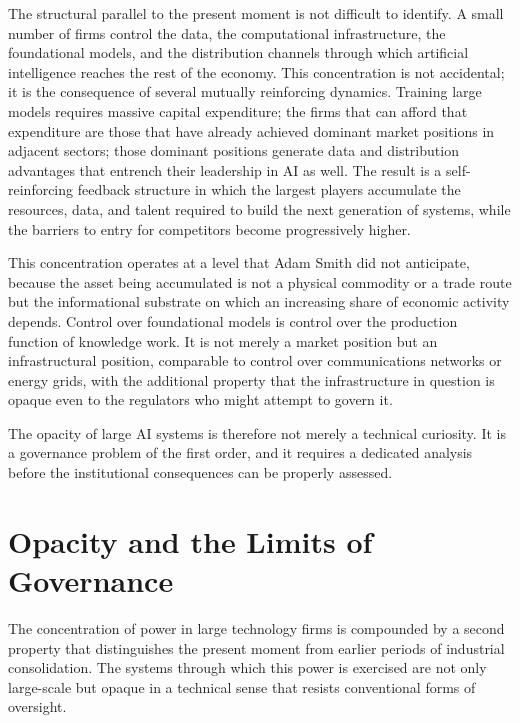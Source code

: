 \documentclass[11pt, a4paper]{article}
\theoremstyle{plain}
\theoremstyle{definition}
\begin{document}
The structural parallel to the present moment is not difficult to identify.
A small number of firms control the data, the computational infrastructure,
the foundational models, and the distribution channels through which artificial
intelligence reaches the rest of the economy. This concentration is not
accidental; it is the consequence of several mutually reinforcing dynamics.
Training large models requires massive capital expenditure; the firms that
can afford that expenditure are those that have already achieved dominant
market positions in adjacent sectors; those dominant positions generate data
and distribution advantages that entrench their leadership in AI as well.
The result is a self-reinforcing feedback structure in which the largest
players accumulate the resources, data, and talent required to build the
next generation of systems, while the barriers to entry for competitors
become progressively higher.

This concentration operates at a level that Adam Smith did not anticipate,
because the asset being accumulated is not a physical commodity or a trade
route but the informational substrate on which an increasing share of economic
activity depends. Control over foundational models is control over the
production function of knowledge work. It is not merely a market position
but an infrastructural position, comparable to control over communications
networks or energy grids, with the additional property that the infrastructure
in question is opaque even to the regulators who might attempt to govern it.

The opacity of large AI systems is therefore not merely a technical curiosity.
It is a governance problem of the first order, and it requires a dedicated
analysis before the institutional consequences can be properly assessed.

\section{Opacity and the Limits of Governance}

The concentration of power in large technology firms is compounded by a second
property that distinguishes the present moment from earlier periods of
industrial consolidation. The systems through which this power is exercised are
not only large-scale but opaque in a technical sense that resists conventional
forms of oversight.
\end{document}
